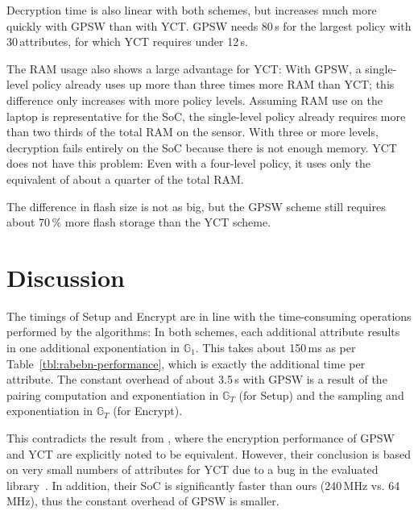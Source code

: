 Decryption time is also linear with both schemes, but increases much more quickly with GPSW than with YCT.
GPSW needs 80\,s for the largest policy with 30\,attributes, for which YCT requires under 12\,s. %

The RAM usage also shows a large advantage for YCT:
With GPSW, a single-level policy already uses up more than three times more RAM than YCT; this difference only increases with more policy levels.
Assuming RAM use on the laptop is representative for the SoC, the single-level policy already requires more than two thirds of the total RAM on the sensor.
With three or more levels, decryption fails entirely on the SoC because there is not enough memory.
YCT does not have this problem: Even with a four-level policy, it uses only the equivalent of about a quarter of the total RAM.

The difference in flash size is not as big, but the GPSW scheme still requires about 70\,\% more flash storage than the YCT scheme.


\section{Discussion}
The timings of Setup and Encrypt are in line with the time-consuming operations performed by the algorithms: 
In both schemes, each additional attribute results in one additional exponentiation in $\mathbb{G}_1$.
This takes about 150\,ms as per Table~\ref{tbl:rabebn-performance}, which is exactly the additional time per attribute.
The constant overhead of about 3.5\,s with GPSW is a result of the pairing computation and exponentiation in $\mathbb{G}_T$ (for Setup) and the sampling and exponentiation in $\mathbb{G}_T$ (for Encrypt).

This contradicts the result from \cite{girgenti_feasibility_2019}, where the encryption performance of GPSW and YCT are explicitly noted to be equivalent.
However, their conclusion is based on very small numbers of attributes for YCT due to a bug in the evaluated library~\cite{girgenti_feasibility_2019}.
In addition, their SoC is significantly faster than ours (240\,MHz vs. 64\,MHz), thus the constant overhead of GPSW is smaller.


